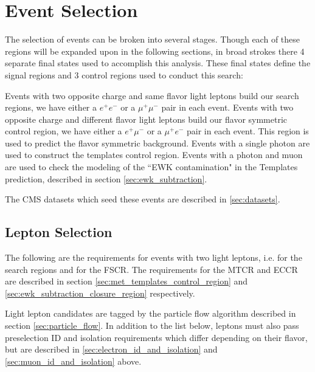 \section{Event Selection}

  The selection of events can be broken into several stages. Though each of these regions will be expanded upon in the following sections, in broad strokes there 4 separate final states used to accomplish this analysis. These final states define the signal regions and 3 control regions used to conduct this search:

  \begin{description}
     Events with two opposite charge and same flavor light leptons build our search regions, we have either a $e^+e^-$ or a $\mu^+ \mu^-$ pair in each event.
     Events with two opposite charge and different flavor light leptons build our flavor symmetric control region, we have either a $e^+\mu^-$ or a $\mu^+ e^-$ pair in each event. This region is used to predict the flavor symmetric background.
     Events with a single photon are used to construct the \MET templates control region. 
     Events with a photon and muon are used to check the modeling of the ``EWK contamination" in the \MET Templates prediction, described in section \ref{sec:ewk_subtraction}.
  \end{description}

  The CMS datasets which seed these events are described in \ref{sec:datasets}.
  
  \subsection{Lepton Selection}
    The following are the requirements for events with two light leptons, i.e. for the search regions and for the FSCR. The requirements for the MTCR and ECCR are described in section \ref{sec:met_templates_control_region} and \ref{sec:ewk_subtraction_closure_region} respectively. 

    Light lepton candidates are tagged by the particle flow algorithm described in section \ref{sec:particle_flow}. In addition to the list below, leptons must also pass preselection ID and isolation requirements which differ depending on their flavor, but are described in \ref{sec:electron_id_and_isolation} and \ref{sec:muon_id_and_isolation} above.

